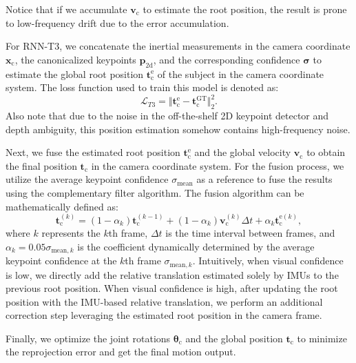 \documentclass[sigconf,nonacm=true]{acmart}
\begin{document}
Notice that if we accumulate $\boldsymbol{{v}_{\mathrm{c}}}$ to estimate the root position, the result is prone to low-frequency drift due to the error accumulation.
\par
For RNN-T3, we concatenate the inertial measurements in the camera coordinate $\boldsymbol{x}_{\mathrm{c}}$, the canonicalized keypoints $\boldsymbol{p}_{\mathrm{2d}}$, and the corresponding confidence $\boldsymbol{\sigma}$ to estimate the global root position $\boldsymbol{t}_{\mathrm{c}}^{\mathrm{e}}$ of the subject in the camera coordinate system. 
The loss function used to train this model is denoted as:
\begin{equation}
\mathcal{L}_{T3}=\Vert \boldsymbol{t}_{\mathrm{c}}^{\mathrm{e}}-\boldsymbol{t}_\mathrm{c}^{\mathrm{GT}} \Vert_2^{2}.
\end{equation}
Also note that due to the noise in the off-the-shelf 2D keypoint detector and depth ambiguity, this position estimation somehow contains high-frequency noise.
\par
Next, we fuse the estimated root position $\boldsymbol{t}_{\mathrm{c}}^{\mathrm{e}}$ and the global velocity $\boldsymbol{{v}_{\mathrm{c}}}$ to obtain the final position $\boldsymbol{{t}_{\mathrm{c}}}$ in the camera coordinate system.
For the fusion process, we utilize the average keypoint confidence $\sigma_{\mathrm{mean}}$ as a reference to fuse the results using the complementary filter algorithm.
The fusion algorithm can be mathematically defined as:
\begin{equation}
    \boldsymbol{t}_{\mathrm{c}}^{(k)} = (1-\alpha_k)\boldsymbol{t}_{\mathrm{c}}^{(k-1)} + (1-\alpha_k)\boldsymbol{v}_{\mathrm{c}}^{(k)}\Delta t + \alpha_k\boldsymbol{t}_{\mathrm{c}}^{\mathrm{e}(k)},
\end{equation}
where $k$ represents the $k$th frame, $\Delta t$ is the time interval between frames, and $\alpha_k=0.05\sigma_{\mathrm{mean},k}$ is the coefficient dynamically determined by the average keypoint confidence at the $k$th frame $\sigma_{\mathrm{mean},k}$.
Intuitively, when visual confidence is low, we directly add the relative translation estimated solely by IMUs to the previous root position.
When visual confidence is high, after updating the root position with the IMU-based relative translation, we perform an additional correction step leveraging the estimated root position in the camera frame.
\par
Finally, we optimize the joint rotations $\boldsymbol{\theta}_{\mathrm{c}}$ and the global position $\boldsymbol{t}_{\mathrm{c}}$ to minimize the reprojection error and get the final motion output.
\end{document}
